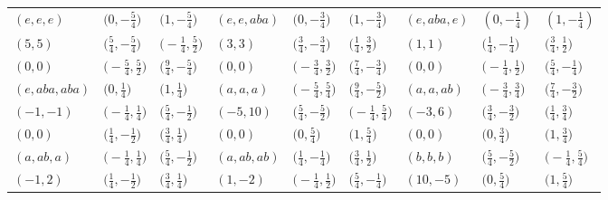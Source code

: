 \documentclass[pdftex]{sigma}
\theoremstyle{definition}
\numberwithin{equation}{section}
\begin{document}
\begin{landscape}
\begin{table}[th]\centering\small
\begin{tabular}{|lll|lll|lll|}\hline
$(e, e, e)$ & $\bigl(0, -\frac{5}{4}\bigr)$ & $\bigl(1, -\frac{5}{4}\bigr)$ & $(e, e, aba)$ & $\bigl(0, -\frac{3}{4}\bigr)$ & $\bigl(1, -\frac{3}{4}\bigr)$ & $\left(e, aba, e\right)$ & $\left(0, -\frac{1}{4}\right)$ & $\left(1, -\frac{1}{4}\right)$
\\
$(5, 5)$ & $\bigl(\frac{5}{4}, -\frac{5}{4}\bigr)$ & $\bigl(-\frac{1}{4}, \frac{5}{2}\bigr)$ & $(3, 3)$ & $\bigl(\frac{3}{4}, -\frac{3}{4}\bigr)$ & $\bigl(\frac{1}{4}, \frac{3}{2}\bigr)$ & $(1, 1)$ & $\bigl(\frac{1}{4}, -\frac{1}{4}\bigr)$ & $\bigl(\frac{3}{4}, \frac{1}{2}\bigr)$
\\
$(0, 0)$ & $\bigl(-\frac{5}{4}, \frac{5}{2}\bigr)$ & $\bigl(\frac{9}{4}, -\frac{5}{4}\bigr)$ & $(0, 0)$ & $\bigl(-\frac{3}{4}, \frac{3}{2}\bigr)$ & $\bigl(\frac{7}{4}, -\frac{3}{4}\bigr)$ & $(0, 0)$ & $\bigl(-\frac{1}{4}, \frac{1}{2}\bigr)$ & $\bigl(\frac{5}{4}, -\frac{1}{4}\bigr)$
\\\hline
$(e, aba, aba)$ & $\bigl(0, \frac{1}{4}\bigr)$ & $\bigl(1, \frac{1}{4}\bigr)$ & $(a, a, a)$ & $\bigl(-\frac{5}{4}, \frac{5}{4}\bigr)$ & $\bigl(\frac{9}{4}, -\frac{5}{2}\bigr)$ & $(a, a, ab)$ & $\bigl(-\frac{3}{4}, \frac{3}{4}\bigr)$ & $\bigl(\frac{7}{4}, -\frac{3}{2}\bigr)$
\\
$(-1, -1)$ & $\bigl(-\frac{1}{4}, \frac{1}{4}\bigr)$ & $\bigl(\frac{5}{4}, -\frac{1}{2}\bigr)$ & $(-5, 10)$ & $\bigl(\frac{5}{4}, -\frac{5}{2}\bigr)$ & $\bigl(-\frac{1}{4}, \frac{5}{4}\bigr)$ & $(-3, 6)$ & $\bigl(\frac{3}{4}, -\frac{3}{2}\bigr)$ & $\bigl(\frac{1}{4}, \frac{3}{4}\bigr)$
\\
$(0, 0)$ & $\bigl(\frac{1}{4}, -\frac{1}{2}\bigr)$ & $\bigl(\frac{3}{4}, \frac{1}{4}\bigr)$ & $(0, 0)$ & $\bigl(0, \frac{5}{4}\bigr)$ & $\bigl(1, \frac{5}{4}\bigr)$ & $(0, 0)$ & $\bigl(0, \frac{3}{4}\bigr)$ & $\bigl(1, \frac{3}{4}\bigr)$
\\\hline
$(a, ab, a)$ & $\bigl(-\frac{1}{4}, \frac{1}{4}\bigr)$ & $\bigl(\frac{5}{4}, -\frac{1}{2}\bigr)$ & $(a, ab, ab)$ & $\bigl(\frac{1}{4}, -\frac{1}{4}\bigr)$ & $\bigl(\frac{3}{4}, \frac{1}{2}\bigr)$ & $(b, b, b)$ & $\bigl(\frac{5}{4}, -\frac{5}{2}\bigr)$ & $\bigl(-\frac{1}{4}, \frac{5}{4}\bigr)$
\\
$(-1, 2)$ & $\bigl(\frac{1}{4}, -\frac{1}{2}\bigr)$ & $\bigl(\frac{3}{4}, \frac{1}{4}\bigr)$ & $(1, -2)$ & $\bigl(-\frac{1}{4}, \frac{1}{2}\bigr)$ & $\bigl(\frac{5}{4}, -\frac{1}{4}\bigr)$ & $(10, -5)$ & $\bigl(0, \frac{5}{4}\bigr)$ & $\bigl(1, \frac{5}{4}\bigr)$

\end{tabular}
\end{table}
\end{landscape}
\end{document}
